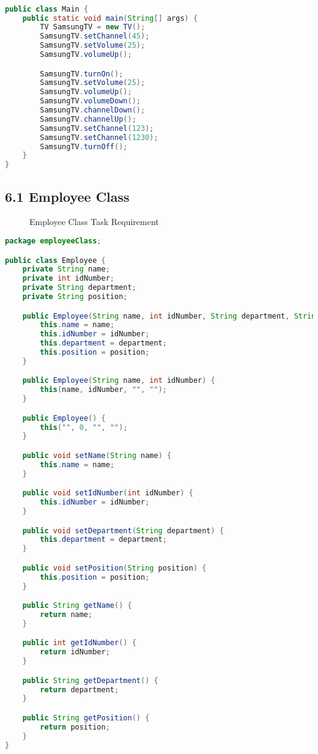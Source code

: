 \documentclass{article}
\begin{document}
\begin{lstlisting}[language=Java, caption=Main.java]

public class Main {
    public static void main(String[] args) {
        TV SamsungTV = new TV();
        SamsungTV.setChannel(45);
        SamsungTV.setVolume(25);
        SamsungTV.volumeUp();

        SamsungTV.turnOn();
        SamsungTV.setVolume(25);
        SamsungTV.volumeUp();
        SamsungTV.volumeDown();
        SamsungTV.channelDown();
        SamsungTV.channelUp();
        SamsungTV.setChannel(123);
        SamsungTV.setChannel(1230);
        SamsungTV.turnOff();
    }
}
\end{lstlisting}

\subsection*{6.1 Employee Class}

\begin{figure}[h]
    \centering
    \caption{Employee Class Task Requirement}
\end{figure}

\begin{lstlisting}[language=Java, caption=Employee.java]
package employeeClass;

public class Employee {
    private String name;
    private int idNumber;
    private String department;
    private String position;

    public Employee(String name, int idNumber, String department, String position) {
        this.name = name;
        this.idNumber = idNumber;
        this.department = department;
        this.position = position;
    }

    public Employee(String name, int idNumber) {
        this(name, idNumber, "", "");
    }

    public Employee() {
        this("", 0, "", "");
    }

    public void setName(String name) {
        this.name = name;
    }

    public void setIdNumber(int idNumber) {
        this.idNumber = idNumber;
    }

    public void setDepartment(String department) {
        this.department = department;
    }

    public void setPosition(String position) {
        this.position = position;
    }

    public String getName() {
        return name;
    }

    public int getIdNumber() {
        return idNumber;
    }

    public String getDepartment() {
        return department;
    }

    public String getPosition() {
        return position;
    }
}

\end{lstlisting}
\end{document}
